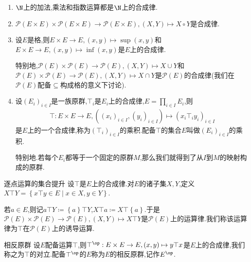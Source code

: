 \begin{example}{}{}
	\begin{enumerate}
		\item $\N$上的加法,乘法和指数运算都是$\N$上的合成律.
		\item $\mathcal{P}\left(E\times E\right)\times\mathcal{P}\left(E\times E\right)\to\mathcal{P}\left(E\times E\right),\left(X,Y\right)\mapsto X\circ Y$是合成律.
		\item 设$E$是格,则$E\times E\to E,\left(x,y\right)\mapsto\sup\left(x,y\right)$和$E\times E\to E,\left(x,y\right)\mapsto\inf\left(x,y\right)$是$E$上的合成律.
		
		特别地,$\mathcal{P}\left(E\right)\times\mathcal{P}\left(E\right)\to\mathcal{P}\left(E\right),\left(X,Y\right)\mapsto X\cup Y$和$\mathcal{P}\left(E\right)\times\mathcal{P}\left(E\right)\to\mathcal{P}\left(E\right),\left(X,Y\right)\mapsto X\cap Y$是$\mathcal{P}\left(E\right)$的合成律(我们在$\mathcal{P}\left(E\right)$配备$\subseteq$构成格的意义下讨论).
		\item 设$\left(E_{i}\right)_{i\in I}$是一族原群,$\top_{i}$是$E_{i}$上的合成律,$E=\prod\limits_{i\in I}E_{i}$,则
		\begin{align*}
			\top:E\times E\to E,\left(\left(x_{i}\right)_{i\in I},\left(y_{i}\right)_{i\in I}\right)\mapsto\left(x_{i}\top_{i} y_{i}\right)_{i\in I}
		\end{align*}
		是$E$上的一个合成律,称为$\left(\top_{i}\right)_{i\in I}$的乘积.配备$\top$的集合$E$叫做$\left(E_{i}\right)_{i\in I}$的乘积.
		
		特别地.若每个$E_{i}$都等于一个固定的原群$M$,那么我们就得到了从$I$到$M$的映射构成的原群.
	\end{enumerate}
\end{example}

\begin{definition}{逐点运算的集合提升}{}
	设$\top$是$E$上的合成律.对$E$的诸子集$X,Y$,定义$X\top Y=\left\{x\top y\in E\middle|x\in X,y\in Y\right\}$.
	
	若$a\in E$,则记$a\top Y\coloneq \left\{a\right\}\top Y$,$X\top a\coloneq X\top\left\{a\right\}$.于是$\mathcal{P}\left(E\right)\times\mathcal{P}\left(E\right)\to\mathcal{P}\left(E\right),\left(X,Y\right)\mapsto X\top Y$是$\mathcal{P}\left(E\right)$上的运算律.我们称该运算律为$\top$在$\mathcal{P}\left(E\right)$上的诱导运算.
\end{definition}

\begin{definition}{相反原群}{}
	设$E$配备运算$\top$,则$\top^{\op}:E\times E\to E,\left(x,y\right)\mapsto y\top x$是$E$上的合成律,我们称之为$\top$的对立.配备$\top^{\op}$的$E$称为$E$的相反原群,记作$E^{\op}$.
\end{definition}

